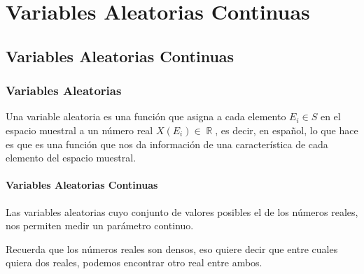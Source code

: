 \documentclass[12pt, fleqn]{report}                             %
\theoremstyle{break}                                            %
\DeclareMathOperator \Reals        {\mathbb{R}}                 %
\begin{document}
\part{Variables Aleatorias Continuas}
\clearpage



    \chapter{Variables Aleatorias Continuas}



        \clearpage
        \section{Variables Aleatorias}

            Una variable aleatoria es una función que asigna a cada elemento $E_i \in S$ en el espacio
            muestral a un número real $X(E_i) \in \Reals$, es decir, en español, lo que hace
            es que es una función que nos da información de una característica de cada elemento
            del espacio muestral.


            \vspace{2em}
            \subsection{Variables Aleatorias Continuas}

                Las variables aleatorias cuyo conjunto de valores posibles el de los números reales, 
                nos permiten medir un parámetro continuo.

                Recuerda que los números reales son densos, eso quiere decir que entre cuales quiera dos
                reales, podemos encontrar otro real entre ambos.  
\end{document}
